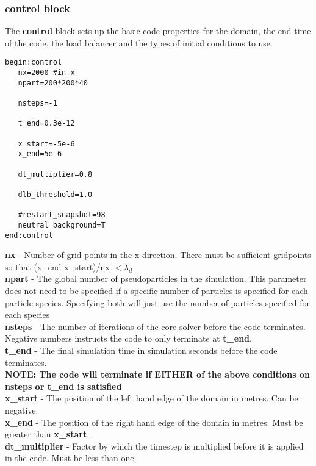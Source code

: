 \documentclass[12pt,a4paper]{article}
\newcommand{\emphtext}{\color{warwickdark} \fontfamily{phv}\selectfont\Large\bf}
\newcommand{\boxverbatim}[1]{\begin{Verbatim}[obeytabs=true,frame=single,
  framerule=0.5mm,rulecolor=\color{warwickmid},formatcom=\color{black},label=#1]}
\newcommand{\inlineemph}[1]{{\color{warwicklight} \bf{#1}}}
\newcommand{\cemph}[1]{{\inlineemph{#1}}}
\begin{document}
\subsubsection{\cemph{control} block}
The \cemph{control} block sets up the basic code properties for the
domain, the end time of the code, the load balancer and the types of initial
conditions to use.

\boxverbatim{control block}
begin:control
   nx=2000 #in x
   npart=200*200*40

   nsteps=-1

   t_end=0.3e-12

   x_start=-5e-6
   x_end=5e-6

   dt_multiplier=0.8

   dlb_threshold=1.0

   #restart_snapshot=98
   neutral_background=T
end:control
\end{Verbatim}


{\emphtext nx} - Number of grid points in the x direction. There must be
sufficient gridpoints so that (x\_end-x\_start)/nx $< \lambda_d$\\

{\emphtext npart} - The global number of pseudoparticles in the
simulation. This parameter does not need to be specified if a specific number
of particles is specified for each particle species. Specifying both will just
use the number of particles specified for each species\\

{\emphtext nsteps} - The number of iterations of the core solver before the
code terminates. Negative numbers instructs the code to only terminate at
\inlineemph{t\_end}.\\

{\emphtext t\_end} - The final simulation time in simulation seconds before the
code terminates.\\

{\emphtext NOTE: The code will terminate if EITHER of the above conditions on
nsteps or t\_end is satisfied}\\

{\emphtext x\_start} - The position of the left hand edge of the domain in
metres. Can be negative.\\

{\emphtext x\_end} - The position of the right hand edge of the domain in
metres. Must be greater than \inlineemph{x\_start}.\\

{\emphtext dt\_multiplier} - Factor by which the timestep is multiplied before
it is applied in the code. Must be less than one.\\
\end{document}
